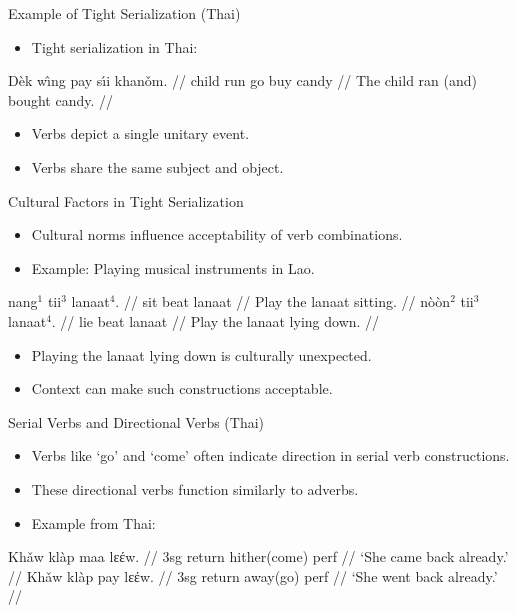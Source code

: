 \documentclass{beamer}
\begin{document}
\begin{frame}{Example of Tight Serialization (Thai)}
\begin{itemize}
    \item Tight serialization in Thai:
\end{itemize}
\ex
\begingl
\gla Dèk wı̂ng pay sı́i khanǒm. //
\glb child run go buy candy //
\glft The child ran (and) bought candy. //
\endgl
\xe
\begin{itemize}
    \item Verbs depict a single unitary event.
    \item Verbs share the same subject and object.
\end{itemize}
\end{frame}

\begin{frame}{Cultural Factors in Tight Serialization}
\begin{itemize}
    \item Cultural norms influence acceptability of verb combinations.
    \item Example: Playing musical instruments in Lao.
\end{itemize}
\ex
\begingl
\gla nang$^1$ tii$^3$ lanaat$^4$. //
\glb sit beat lanaat //
\glft Play the lanaat sitting. //
\endgl
\xe
\ex
\begingl
\gla nòòn$^2$ tii$^3$ lanaat$^4$. //
\glb lie beat lanaat //
\glft Play the lanaat lying down. //
\endgl
\xe
\begin{itemize}
    \item Playing the lanaat lying down is culturally unexpected.
    \item Context can make such constructions acceptable.
\end{itemize}
\end{frame}

\begin{frame}{Serial Verbs and Directional Verbs (Thai)}
\begin{itemize}
    \item Verbs like ‘go’ and ‘come’ often indicate direction in serial verb constructions.
    \item These directional verbs function similarly to adverbs.
    \item Example from Thai:
\end{itemize}
\ex
\begingl
\gla Khǎw klàp maa {\silipa lɛέw}. //
\glb 3sg return hither(come) perf //
\glft ‘She came back already.’ //
\endgl
\xe
\ex
\begingl
\gla Khǎw klàp pay  {\silipa lɛέw}. //
\glb 3sg return away(go) perf //
\glft ‘She went back already.’ //
\endgl
\xe
\end{frame}
\end{document}
